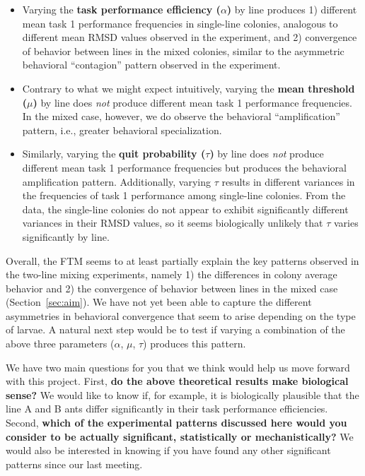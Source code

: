 \documentclass[11pt]{article}
\begin{document}
\begin{itemize}
	\item Varying the \textbf{task performance efficiency ($\alpha$)} by line produces 1) different mean task 1 performance frequencies in single-line colonies, analogous to different mean RMSD values observed in the experiment, and 2) convergence of behavior between lines in the mixed colonies, similar to the asymmetric behavioral ``contagion'' pattern observed in the experiment.
	
	\item Contrary to what we might expect intuitively, varying the \textbf{mean threshold ($\mu$)} by line does \textit{not} produce different mean task 1 performance frequencies. In the mixed case, however, we do observe the behavioral ``amplification'' pattern, i.e., greater behavioral specialization.

	\item Similarly, varying the \textbf{quit probability ($\tau$)} by line does \textit{not} produce different mean task 1 performance frequencies but produces the behavioral amplification pattern. Additionally, varying $\tau$ results in different variances in the frequencies of task 1 performance among single-line colonies. 
	From the data, the single-line colonies do not appear to exhibit significantly different variances in their RMSD values,
so it seems biologically unlikely that $\tau$ varies significantly by line.

\end{itemize}

Overall, the FTM seems to at least partially explain the key patterns observed in the two-line mixing experiments, namely 1) the differences in colony average behavior and 2) the convergence of behavior between lines in the mixed case (Section~\ref{sec:aim}). We have not yet been able to capture the different asymmetries in behavioral convergence that seem to arise  depending on the type of larvae. A natural next step would be to test if varying a combination of the above three parameters ($\alpha$, $\mu$, $\tau$) produces this pattern.

We have two main questions for you that we think would help us move forward with this project. First, \textbf{do the above theoretical results make biological sense?} We would like to know if, for example, it is biologically plausible that the line A and B ants differ significantly in their task performance efficiencies. Second, \textbf{which of the experimental patterns discussed here would you consider to be actually significant, statistically or mechanistically?} We would also be interested in knowing if you have found any other significant patterns since our last meeting.
\end{document}
